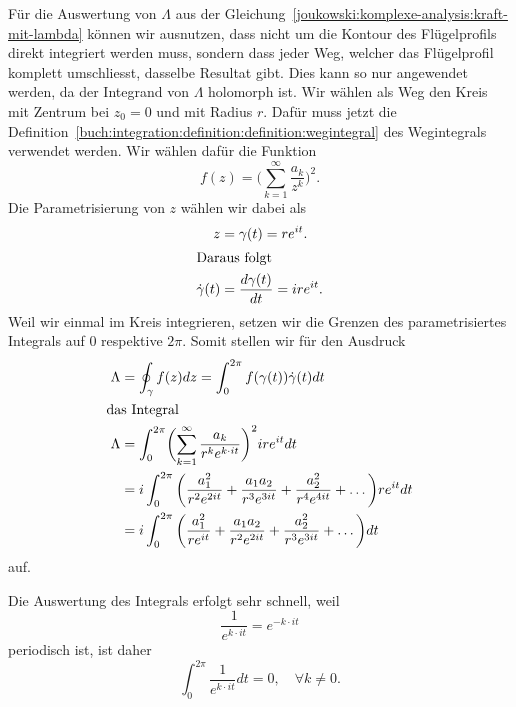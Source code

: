 Für die Auswertung von $\Lambda$
aus der Gleichung~\eqref{joukowski:komplexe-analysis:kraft-mit-lambda} können wir ausnutzen,
dass nicht um die Kontour des Flügelprofils direkt integriert werden muss,
sondern dass jeder Weg, welcher das Flügelprofil komplett umschliesst, dasselbe Resultat gibt.
Dies kann so nur angewendet werden, da der Integrand von $\Lambda$ holomorph ist.
Wir wählen als Weg den Kreis mit Zentrum bei $z_0 = 0$ und mit Radius $r$.
Dafür muss jetzt die Definition~\ref{buch:integration:definition:definition:wegintegral} des Wegintegrals verwendet werden.
Wir wählen dafür die Funktion 
\[
	f(z)
	=
	\biggl(\displaystyle\sum_{k=1}^{\infty} \frac{a_k}{z^k}\biggr)^2.
\]
Die Parametrisierung von $z$ wählen wir dabei als
\begin{align*}
	z
	&=
	\gamma(t)
	=
	r e^{i t}.
	\\
	\intertext{Daraus folgt}
	\dot{\gamma}(t)
	&=
	\frac{d\gamma(t)}{dt}
	=
	i r e^{i t}.
	\\
\end{align*}
Weil wir einmal im Kreis integrieren, setzen wir die Grenzen des parametrisiertes Integrals auf $0$ respektive $2\pi$.
Somit stellen wir für den Ausdruck
\begin{align}
	\Lambda
	&=
	\displaystyle\oint_{\gamma}
	f(z)
	dz
	=
	\displaystyle\int_{0}^{2\pi}
	f(\gamma(t))
	\dot{\gamma}(t)
	dt
	\notag
	\\
	\intertext{das Integral}
	\Lambda
	&=
	\displaystyle\int_{0}^{2\pi} 
	\biggl(\sum_{k=1}^{\infty} \frac{a_k}{r^k e^{k \cdot i t}}\biggr)^2
	i r e^{i t}
	dt 
	\notag
	\\
	\quad
	&=
	i \displaystyle\int_{0}^{2\pi}
	\bigg(\frac{a_1^2}{r^2 e^{2i t}} + \frac{a_1 a_2}{r^3 e^{3i t}} + \frac{a_2^2}{r^4 e^{4i t}} + \dots \bigg) 
	r e^{i t}
	dt
	\notag
	\\
	\quad
	&=
	i \displaystyle\int_{0}^{2\pi}
	\bigg(\frac{a_1^2}{r e^{i t}} + \frac{a_1 a_2}{r^2 e^{2i t}} + \frac{a_2^2}{r^3 e^{3i t}} + \dots \bigg) 
	dt
	\label{joukowski:komplexe-analysis:parametrisiertes-lambda}
\end{align}
auf.

Die Auswertung des Integrals erfolgt sehr schnell, weil
\[
	\frac{1}{e^{k \cdot i t}}
	=
	e^{-k \cdot i t}
\]
periodisch ist, ist daher
\begin{equation}
	\displaystyle\int_{0}^{2\pi}
	\frac{1}{e^{k \cdot i t}}
	dt
	=
	0,
	\quad
	\forall
	k \neq 0.
	\label{joukowski:komplexe-analysis:integral-e-hoch-kit}
\end{equation}

